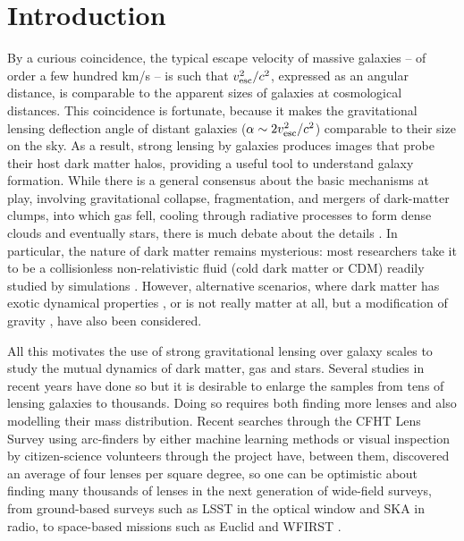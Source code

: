 
\section{Introduction}

By a curious coincidence, the typical escape velocity of massive
galaxies -- of order a few hundred km/s -- is such that $v_{\rm
  esc}^2/c^2$, expressed as an angular distance, is comparable to the
apparent sizes of galaxies at cosmological distances.  This
coincidence is fortunate, because it makes the gravitational lensing
deflection angle of distant galaxies ($\alpha\sim 2v_{\rm esc}^2/c^2$)
comparable to their size on the sky. As a result, strong lensing by
galaxies produces images that probe their host dark matter halos,
providing a useful tool to understand galaxy formation.  While there
is a general consensus about the basic mechanisms at play, involving
gravitational collapse, fragmentation, and mergers of dark-matter
clumps, into which gas fell, cooling through radiative processes to
form dense clouds and eventually stars, there is much debate about the
details \citep[for a summary, see][]{2012RAA....12..917S}.  In
particular, the nature of dark matter remains mysterious: most
researchers take it to be a collisionless non-relativistic fluid (cold
dark matter or CDM) readily studied by simulations \citep[for example,
  the influential Millennium
  simulation,][]{2005Natur.435..629S}. However, alternative scenarios,
where dark matter has exotic dynamical properties
\citep{2010MNRAS.405...77S,2016ApJ...818...89S}, or is not really
matter at all, but a modification of gravity
\citep{2016PhRvL.117t1101M}, have also been considered.

All this motivates the use of strong gravitational lensing over galaxy
scales to study the mutual dynamics of dark matter, gas and stars.
Several studies in recent years have done so \citep[see,
  e.g.,][]{2009ApJ...703L..51K,2011ApJ...740...97L,2012MNRAS.424..104L,
  2016MNRAS.459.3677L,2016MNRAS.456..870B} but it is desirable to
enlarge the samples from tens of lensing galaxies to thousands.  Doing
so requires both finding more lenses and also modelling their mass
distribution.  Recent searches through the CFHT Lens Survey
\citep[CFHTLS,][]{2012MNRAS.427..146H} using arc-finders
\citep[e.g.,][]{2012ApJ...749...38M,2014A&A...567A.111M,2014ApJ...785..144G,2017arXiv170401585S}
by either machine learning methods 
\citep[e.g.,][]{2016A&A...592A..75P,2017arXiv170302642L} or visual
inspection by citizen-science volunteers through the \SW project 
\citep{2016MNRAS.455.1191M} have, between them, discovered an average
of four lenses per square degree, so one can be optimistic about
finding many thousands of lenses in the next generation of wide-field
surveys, from ground-based surveys such as LSST in the optical window
and SKA in radio, to space-based missions such as Euclid and WFIRST 
\citep{2010MNRAS.405.2579O,2015ApJ...811...20C}.

